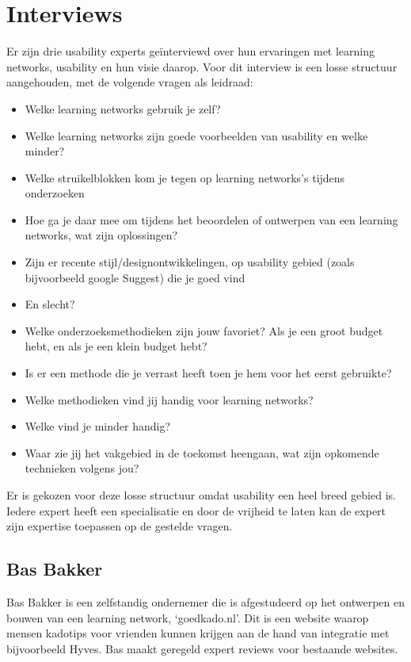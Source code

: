 \chapter{Interviews}
\label{interviewappendix}
Er zijn drie usability experts ge\"interviewd over hun ervaringen met learning networks, usability en hun visie daarop. Voor dit interview is een losse structuur aangehouden, met de volgende vragen als leidraad:

\begin{itemize}
  \item Welke learning networks gebruik je zelf?
  \item Welke learning networks zijn goede voorbeelden van usability en welke minder?

  \item Welke struikelblokken kom je tegen op learning networks's tijdens onderzoeken
  \item Hoe ga je daar mee om tijdens het beoordelen of ontwerpen van een learning networks, wat zijn oplossingen?

  \item Zijn er recente stijl/designontwikkelingen, op usability gebied (zoals bijvoorbeeld google Suggest) die je goed vind
  \item En slecht?

  \item Welke onderzoeksmethodieken zijn jouw favoriet? Als je een groot budget hebt, en als je een klein budget hebt?
  \item Is er een methode die je verrast heeft toen je hem voor het eerst gebruikte?

  \item Welke methodieken vind jij handig voor learning networks?
  \item Welke vind je minder handig?

  \item Waar zie jij het vakgebied in de toekomst heengaan, wat zijn opkomende technieken volgens jou?
\end{itemize}

Er is gekozen voor deze losse structuur omdat usability een heel breed gebied is. Iedere expert heeft een specialisatie en door de vrijheid te laten kan de expert zijn expertise toepassen op de gestelde vragen.

\section{Bas Bakker}
Bas Bakker is een zelfstandig ondernemer die is afgestudeerd op het ontwerpen en bouwen van een learning network, `goedkado.nl'. Dit is een website waarop mensen kadotips voor vrienden kunnen krijgen aan de hand van integratie met bijvoorbeeld Hyves. Bas maakt geregeld expert reviews voor bestaande websites.

